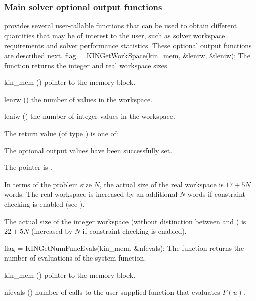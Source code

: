 \subsubsection{Main solver optional output functions}\label{sss:output_main}
{\kinsol} provides several user-callable functions that can be used to obtain
different quantities that may be of interest to the user, such as solver workspace
requirements and solver performance statistics.
These optional output functions are described next.
{
  flag = KINGetWorkSpace(kin\_mem, \&lenrw, \&leniw);
}
{
  The function  returns the
  {\kinsol} integer and real workspace sizes.
}
{
  \begin{args}
  \item[kin\_mem] ()
    pointer to the {\kinsol} memory block.
  \item[lenrw] ()
    the number of  values in the {\kinsol} workspace.
  \item[leniw] ()
    the number of integer values in the {\kinsol} workspace.
  \end{args}
}
{
  The return value  (of type ) is one of:
  \begin{args}
  \item[\Id{KIN\_SUCCESS}] 
    The optional output values have been successfully set.
  \item[\Id{KIN\_MEM\_NULL}]
    The  pointer is .
  \end{args}
}
{
  In terms of the problem size $N$, the actual size of the real workspace 
  is $17 + 5 N$  words. The real workspace is increased by
  an additional $N$ words if constraint checking is enabled (see ).

  The actual size of the integer workspace (without distinction between  
  and ) is $22 + 5 N$ (increased by $N$ if constraint checking is enabled).
}
{
  flag = KINGetNumFuncEvals(kin\_mem, \&nfevals);
}
{
  The function  returns the number of evaluations
  of the system function.
}
{
  \begin{args}
  \item[kin\_mem] ()
    pointer to the {\kinsol} memory block.
  \item[nfevals] ()
    number of calls to the user-supplied function that evaluates $F(u)$.
  \end{args}
}
